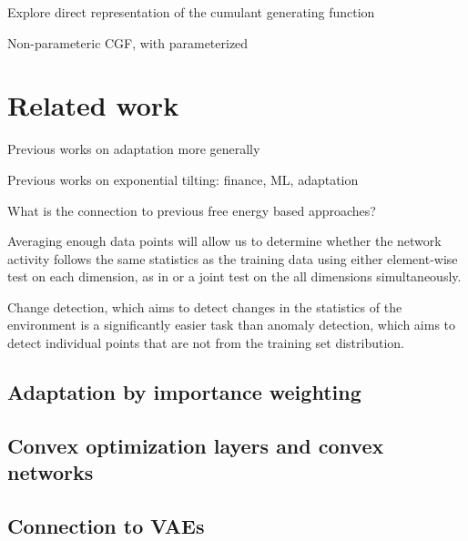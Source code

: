 \documentclass{article}      %
\begin{document}
Explore direct representation of the cumulant generating function 

Non-parameteric CGF, with parameterized 



\section{Related work}


Previous works on adaptation more generally

Previous works on exponential tilting: finance, ML, adaptation 


What is the connection to previous free energy based approaches?


Averaging enough data points will allow us to determine whether the network activity follows the same statistics as the training data using either element-wise test on each dimension, as in \cite{rabanser_failing_2019} or a joint test on the all dimensions simultaneously.


Change detection, which aims to detect changes in the statistics of the environment is a significantly easier task than anomaly detection, which aims to detect individual points that are not from the training set distribution.


\subsection{Adaptation by importance weighting}





\subsection{Convex optimization layers and convex networks}




\subsection{Connection to VAEs}
\end{document}
